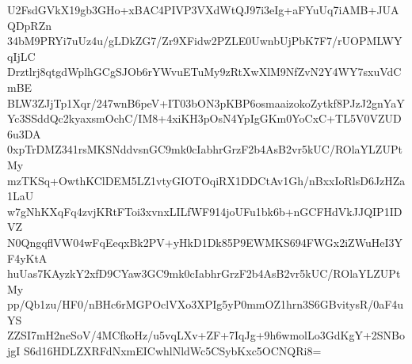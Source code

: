 U2FsdGVkX19gb3GHo+xBAC4PIVP3VXdWtQJ97i3eIg+aFYuUq7iAMB+JUAQDpRZn
34bM9PRYi7uUz4u/gLDkZG7/Zr9XFidw2PZLE0UwnbUjPbK7F7/rUOPMLWYqIjLC
Drztlrj8qtgdWplhGCgSJOb6rYWvuETuMy9zRtXwXlM9NfZvN2Y4WY7sxuVdCmBE
BLW3ZJjTp1Xqr/247wnB6peV+IT03bON3pKBP6osmaaizokoZytkf8PJzJ2gnYaY
Yc3SSddQc2kyaxsmOchC/IM8+4xiKH3pOsN4YpIgGKm0YoCxC+TL5V0VZUD6u3DA
0xpTrDMZ341rsMKSNddvsnGC9mk0cIabhrGrzF2b4AsB2vr5kUC/ROlaYLZUPtMy
mzTKSq+OwthKClDEM5LZ1vtyGIOTOqiRX1DDCtAv1Gh/nBxxIoRlsD6JzHZa1LaU
w7gNhKXqFq4zvjKRtFToi3xvnxLILfWF914joUFu1bk6b+nGCFHdVkJJQIP1IDVZ
N0QngqflVW04wFqEeqxBk2PV+yHkD1Dk85P9EWMKS694FWGx2iZWuHeI3YF4yKtA
huUas7KAyzkY2xfD9CYaw3GC9mk0cIabhrGrzF2b4AsB2vr5kUC/ROlaYLZUPtMy
pp/Qb1zu/HF0/nBHc6rMGPOclVXo3XPIg5yP0mmOZ1hrn3S6GBvitysR/0aF4uYS
ZZSI7mH2neSoV/4MCfkoHz/u5vqLXv+ZF+7IqJg+9h6wmolLo3GdKgY+2SNBojgI
S6d16HDLZXRFdNxmEICwhlNldWc5CSybKxc5OCNQRi8=
